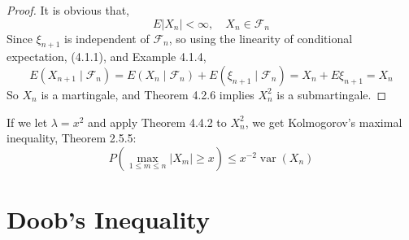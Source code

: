 \begin{proof}
    It is obvious that,
    \begin{equation*}
        E\left|X_{n}\right|<\infty,\quad X_{n}\in\mathcal{F}_{n}
    \end{equation*}
    Since $\xi_{n+1}$ is independent of $\mathcal{F}_{n}$, so using the linearity of conditional expectation, (4.1.1), and Example 4.1.4,
    \begin{equation*}
        E\left(X_{n+1}\mid\mathcal{F}_{n}\right)=E\left(X_{n}\mid\mathcal{F}_{n}\right)+E\left(\xi_{n+1}\mid\mathcal{F}_{n}\right)=X_{n}+E\xi_{n+1}=X_{n}
    \end{equation*}
    So $X_{n}$ is a martingale, and Theorem 4.2.6 implies $X_{n}^{2}$ is a submartingale.
\end{proof}

\begin{note}
    If we let $\lambda=x^{2}$ and apply Theorem 4.4.2 to $X_{n}^{2}$, we get Kolmogorov's maximal inequality, Theorem 2.5.5:
    \begin{equation}
        P\left(\max_{1\leq m\leq n}\left|X_{m}\right|\geq x\right)\leq x^{-2}\operatorname{var}\left(X_{n}\right)
    \end{equation}
\end{note}

\begin{theorem}
    
\end{theorem}

\begin{theorem}
    
\end{theorem}

\begin{definition}
    
\end{definition}

\begin{definition}
    
\end{definition}

\begin{theorem}
    
\end{theorem}

\section{Doob's Inequality}

